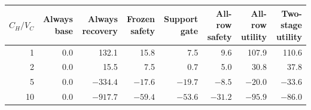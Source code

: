 \begin{tabular}{rrrrrrrr}
\toprule
$C_H/V_C$ & Always base & Always recovery & Frozen safety & Support gate & All-row safety & All-row utility & Two-stage utility \\
\midrule
1 & 0.0 & 132.1 & 15.8 & 7.5 & 9.6 & 107.9 & 110.6 \\
2 & 0.0 & 15.5 & 7.5 & 0.7 & 5.0 & 30.8 & 37.8 \\
5 & 0.0 & $-334.4$ & $-17.6$ & $-19.7$ & $-8.5$ & $-20.0$ & $-33.6$ \\
10 & 0.0 & $-917.7$ & $-59.4$ & $-53.6$ & $-31.2$ & $-95.9$ & $-86.0$ \\
\bottomrule
\end{tabular}
